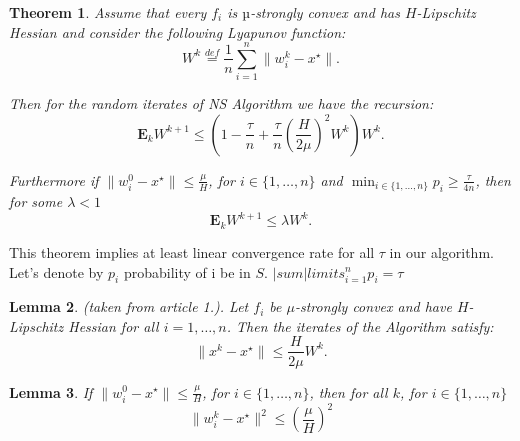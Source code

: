 \documentclass{article}
\newtheorem{theorem}{Theorem}
\newtheorem{lemma}[theorem]{Lemma}
\begin{document}
\begin{theorem} Assume that every $f_i$ is $µ$-strongly convex and has $H$-Lipschitz Hessian and consider
the following Lyapunov function:
\begin{equation}
    W^k \overset{def}{=} \frac{1}{n}\sum\limits_{i=1}^{n}\|w_i^k - x^\star\|.
\end{equation}

Then for the random iterates of NS Algorithm we have the recursion:
\begin{equation}
    \mathbf{E}_k W^{k + 1} \leq \left(1 - \frac{\tau}{n} +
    \frac{\tau}{n}\left(\frac{H}{2\mu}\right)^2W^k\right)W^k.
\end{equation}

Furthermore if $\|w_i^0 - x^\star\| \leq \frac{\mu}{H}$, for $i \in \{1, \dots, n\}$ and $\min_{i \in \{1, \dots, n\}}{p_i} \geq \frac{\tau}{4n}$, then for some $\lambda < 1$
\begin{equation}
    \mathbf{E}_k W^{k + 1} \leq \lambda W^k.
\end{equation}
\end{theorem}

This theorem implies at least linear convergence rate for all $\tau$ in our algorithm.
Let's denote by $p_i$ probability of i be in $S$. $|sum|limits_{i=1}^n p_i = \tau$

\begin{lemma} (taken from article 1.).
Let $f_i$ be $\mu$-strongly convex and have $H$-Lipschitz Hessian for all $i = 1, \dots, n$. Then
the iterates of the Algorithm satisfy:
\begin{equation}
    \|x^k - x^\star\| \leq \frac{H}{2\mu}W^k.
\end{equation}
\end{lemma}

\begin{lemma}
If $\|w_i^0 - x^\star\| \leq \frac{\mu}{H}$, for $i \in \{1, \dots, n\}$, then for all $k$, for $i \in \{1, \dots, n\}$
\begin{equation}
    \|w_i^k - x^\star\|^2 \leq \left(\frac{\mu}{H}\right)^2
\end{equation}
\end{lemma}
\end{document}
